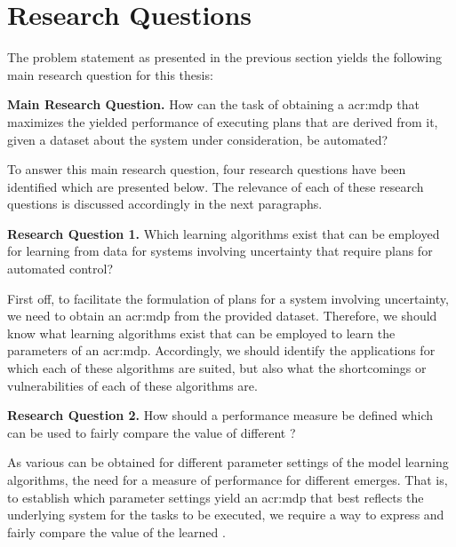 \section{Research Questions}
\label{sec:research-questions}
The problem statement as presented in the previous section yields the following main research question for this thesis:

\vspace{12pt}
\noindent\textbf{Main Research Question.} How can the task of obtaining a \acrfull{acr:mdp} that maximizes the yielded performance of executing plans that are derived from it, given a dataset about the system under consideration, be automated?
\vspace{12pt}

To answer this main research question, four research questions have been identified which are presented below.
The relevance of each of these research questions is discussed accordingly in the next paragraphs.

\vspace{12pt}
\noindent\textbf{Research Question 1.} Which learning algorithms exist that can be employed for learning  from data for systems involving uncertainty that require plans for automated control?
\vspace{0pt}

First off, to facilitate the formulation of plans for a system involving uncertainty, we need to obtain an \acrshort{acr:mdp} from the provided dataset.
Therefore, we should know what learning algorithms exist that can be employed to learn the parameters of an \acrshort{acr:mdp}.
Accordingly, we should identify the applications for which each of these algorithms are suited, but also what the shortcomings or vulnerabilities of each of these algorithms are.

\vspace{12pt}
\noindent\textbf{Research Question 2.} How should a performance measure be defined which can be used to fairly compare the value of different ?
\vspace{12pt}

As various  can be obtained for different parameter settings of the model learning algorithms, the need for a measure of performance for different  emerges.
That is, to establish which parameter settings yield an \acrshort{acr:mdp} that best reflects the underlying system for the tasks to be executed, we require a way to express and fairly compare the value of the learned .

